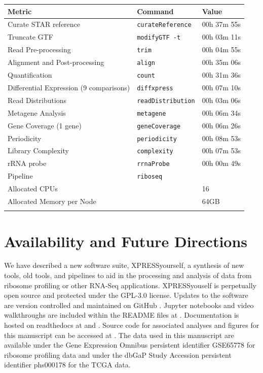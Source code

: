 \documentclass[10pt, oneside]{article}
\begin{document}
\begin{table}[h]
    \centering
{}
\begin{tabular}{p{5cm}p{5cm}p{3cm}}
\textbf{Metric} & \textbf{Command} & \textbf{Value} \\
  \hline
  Curate STAR reference & \texttt{curateReference} & 00h 37m 55s \\
  \hline
  Truncate GTF & \texttt{modifyGTF -t} & 00h 03m 11s \\
  \hline
  Read Pre-processing & \texttt{trim} & 00h 04m 55s \\
  \hline
  Alignment and Post-processing & \texttt{align} & 00h 35m 06s \\
  \hline
  Quantification & \texttt{count} & 00h 31m 36s \\
  \hline
  Differential Expression (9 comparisons) & \texttt{diffxpress} & 00h 07m 10s \\
  \hline
  Read Distributions & \texttt{readDistribution} & 00h 03m 06s \\
  \hline
  Metagene Analysis & \texttt{metagene} & 00h 06m 34s \\
  \hline
  Gene Coverage (1 gene) & \texttt{geneCoverage} & 00h 06m 26s \\
  \hline
  Periodicity & \texttt{periodicity} & 00h 08m 53s \\
  \hline
  Library Complexity & \texttt{complexity} & 00h 07m 53s \\
  \hline
  rRNA probe & \texttt{rrnaProbe} & 00h 00m 49s \\
  \hline
  Pipeline & \texttt{riboseq} &  \\
  \hline
  Allocated CPUs & & 16 \\
  \hline
  Allocated Memory per Node & & 64GB \\
 \label{tab:submodulebreakdown}
\end{tabular}
\end{table}

\section*{Availability and Future Directions}
We have described a new software suite, XPRESSyourself, a synthesis of new tools, old tools, and pipelines to aid in the processing and analysis of data from ribosome profiling or other RNA-Seq applications. XPRESSyouself is perpetually open source and protected under the GPL-3.0 license. Updates to the software are version controlled and maintained on GitHub \cite{xpressyourself}. Jupyter notebooks and video walkthroughs are included within the README files at \cite{xpressyourself}. Documentation is hosted on readthedocs \cite{readthedocs} at \cite{xpresspipe_docs} and \cite{xpressplot_docs}. Source code for associated analyses and figures for this manuscript can be accessed at \cite{manuscript}. The data used in this manuscript are available under the Gene Expression Omnibus persistent identifier GSE65778 \cite{isrib_geo} for ribosome profiling data and under the dbGaP Study Accession persistent identifier phs000178 \cite{tcga_data} for the TCGA data. \par
\end{document}

